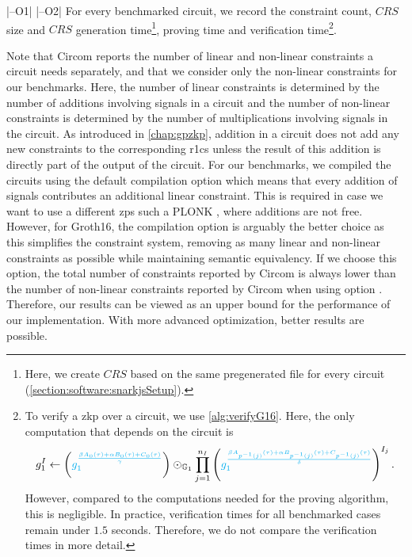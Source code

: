 |--O1|
|--O2|
For every benchmarked circuit, we record the constraint count, $CRS$ size and $CRS$ generation time\footnote{
    \label{footnote:crsBasedOnPtauFile}
    Here, we create $CRS$ based on the same pregenerated file  for every circuit (\cref{section:software:snarkjsSetup}).
},
proving time and verification time\footnote{
    \label{footnote:ignoreProofVerificationTimes}
    To verify a \gls{zkp} over a circuit, we use \cref{alg:verifyG16}.
    Here, the only computation that depends on the circuit is
    \begin{align*}
        g_1^I\gets \left(\textcolor{cyan}{g_1^\frac{\beta A_0(\tau)+\alpha B_0(\tau)+C_0(\tau)}{\gamma}}\right)\odot_{\mathbb{G}_1}\prod\limits_{j=1}^{n_I}\left(\textcolor{cyan}{g_1^\frac{\beta A_{p^{-1}(j)}(\tau)+\alpha B_{p^{-1}(j)}(\tau) + C_{p^{-1}(j)}(\tau)}{\delta}}\right)^{I_j}\text{.}
    \end{align*}
    However, compared to the computations needed for the proving algorithm, this is negligible.
    In practice, verification times for all benchmarked cases remain under $1.5$ seconds.
    Therefore, we do not compare the verification times in more detail.
}.

Note that Circom reports the number of linear and non-linear constraints a circuit needs separately, and that we consider only the non-linear constraints for our benchmarks.
Here, the number of linear constraints is determined by the number of additions involving signals in a circuit and the number of non-linear constraints is determined by the number of multiplications involving signals in the circuit.
As introduced in \cref{chap:gpzkp}, addition in a circuit does not add any new constraints to the corresponding \gls{r1cs} unless the result of this addition is directly part of the output of the circuit.
For our benchmarks, we compiled the circuits using the default compilation option  which means that every addition of signals contributes an additional linear constraint.
This is required in case we want to use a different \gls{zps} such a PLONK \cite{gabizon_plonk_2019}, where additions are not free.
However, for Groth16, the compilation option  is arguably the better choice as this simplifies the constraint system, removing as many linear and non-linear constraints as possible while maintaining semantic equivalency.
If we choose this option, the total number of constraints reported by Circom is always lower than the number of non-linear constraints reported by Circom when using option .
Therefore, our results can be viewed as an upper bound for the performance of our implementation.
With more advanced optimization, better results are possible.

